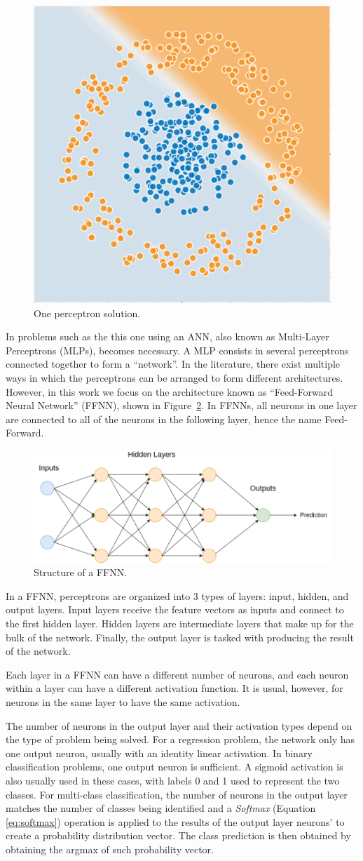 \begin{figure}[!htbp]
    \centering
    \includegraphics[width=.35\textwidth]{Images/circles_perceptron.png}
    \caption{One perceptron solution.}
    \label{fig:one_perceptron}
\end{figure}

In problems such as the this one using an ANN, also known as Multi-Layer Perceptrons (MLPs), becomes necessary. A MLP consists in several perceptrons connected together to form a ``network''. In the literature, there exist multiple ways in which the perceptrons can be arranged to form different architectures. However, in this work we focus on the architecture known as ``Feed-Forward Neural Network'' (FFNN), shown in Figure~\ref{fig:ffnn}. In FFNNs, all neurons in one layer are connected to all of the neurons in the following layer, hence the name Feed-Forward.
\begin{figure}[!htbp]
    \centering
    \includegraphics[width=.5\textwidth]{Images/mlp.png}
    \caption{Structure of a FFNN.}
    \label{fig:ffnn}
\end{figure}

In a FFNN, perceptrons are organized into 3 types of layers: input, hidden, and output layers.  Input layers receive the feature vectors as inputs and connect to the first hidden layer. Hidden layers are intermediate layers that make up for the bulk of the network. Finally, the output layer is tasked with producing the result of the network. 

Each layer in a FFNN can have a different number of neurons, and each neuron within a layer can have a different activation function. It is usual, however, for neurons in the same layer to have the same activation. 

The number of neurons in the output layer and their activation types depend on the type of problem being solved. For a regression problem, the network only has one output neuron, usually with an identity linear activation. In binary classification problems, one output neuron is sufficient. A sigmoid activation is also usually used in these cases, with labels 0 and 1 used to represent the two classes. For multi-class classification, the number of neurons in the output layer matches the number of classes being identified and a \textit{Softmax} (Equation \ref{eq:softmax}) operation is applied to the results of the output layer neurons' to create a probability distribution vector. The class prediction is then obtained by obtaining the argmax of such probability vector.

